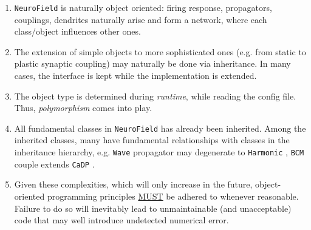 \documentclass[12pt,a4paper]{article}
\newcommand{\type}[1]{ {\small\small\tt #1} }
\newcommand{\NF}[0]{ \type{NeuroField}}
\begin{document}
\begin{enumerate}
	\item \NF is naturally object oriented: firing response, propagators, couplings, dendrites naturally arise and form a network, where each class/object influences other ones.
	\item The extension of simple objects to more sophisticated ones (e.g. from static to plastic synaptic coupling) may naturally be done via inheritance. In many cases, the interface is kept while the implementation is extended.
	\item The object type is determined during \emph{runtime}, while reading the config file. Thus, \emph{polymorphism} comes into play.
	\item All fundamental classes in \NF has already been inherited. Among the inherited classes, many have fundamental relationships with classes in the inheritance hierarchy, e.g. \type{Wave} propagator may degenerate to \type{Harmonic}, \type{BCM} couple extends \type{CaDP}.
	\item Given these complexities, which will only increase in the future, object-oriented programming principles \underline{MUST} be adhered to whenever reasonable. Failure to do so will inevitably lead to unmaintainable (and unacceptable) code that may well introduce undetected numerical error.
\end{enumerate}
\end{document}
